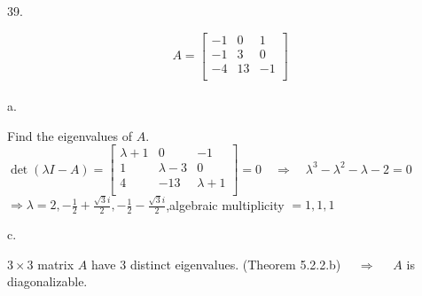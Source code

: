 \documentclass[12pt]{book}
\begin{document}
\begin{CJK}{UTF8}{bsmi}
39. \begin{minipage}[t]{\dimexpr\linewidth}
\[ A=
\begin{bmatrix}
-1 &  0 &  1 \\
-1 &  3 &  0 \\
-4 & 13 & -1 \\
\end{bmatrix}
\]\\[-25pt]
a. \begin{minipage}[t]{\dimexpr\linewidth}
Find the eigenvalues of $A$. \\
$\det(\lambda I-A)=\begin{bmatrix}
\lambda+1 &  0 &  -1 \\
1 &  \lambda-3 &  0 \\
4 & -13 & \lambda+1 \\
\end{bmatrix}=0\quad\Rightarrow\quad
\lambda^3-\lambda^2-\lambda-2=0$\\
$\Rightarrow \lambda=2, -\frac{1}{2}+\frac{\sqrt{3}i}{2}, -\frac{1}{2}-\frac{\sqrt{3}i}{2}$,\quad algebraic multiplicity $=1,1,1$ \\
\end{minipage}
c. \begin{minipage}[t]{\dimexpr\linewidth}
$3\times 3$ matrix $A$ have 3 distinct eigenvalues. (Theorem 5.2.2.b) $\quad\Rightarrow\quad$ $A$ is diagonalizable.
\end{minipage}
\end{minipage} \\


\end{CJK}
\end{document}
